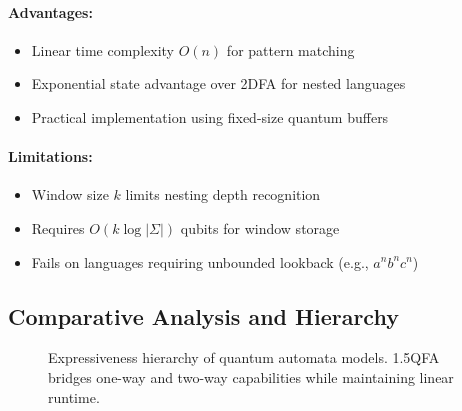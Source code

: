 \paragraph{Advantages:}
\begin{itemize}
    \item Linear time complexity $O(n)$ for pattern matching
    \item Exponential state advantage over 2DFA for nested languages
    \item Practical implementation using fixed-size quantum buffers
\end{itemize}

\paragraph{Limitations:}
\begin{itemize}
    \item Window size $k$ limits nesting depth recognition
    \item Requires $O(k\log|\Sigma|)$ qubits for window storage
    \item Fails on languages requiring unbounded lookback (e.g., $a^nb^nc^n$)
\end{itemize}

\subsection*{Comparative Analysis and Hierarchy}
\begin{figure}[h]
\centering
{}
\caption{Expressiveness hierarchy of quantum automata models. 1.5QFA bridges one-way and two-way capabilities while maintaining linear runtime.}
\label{fig:1.5qfa-hierarchy}
\end{figure}

